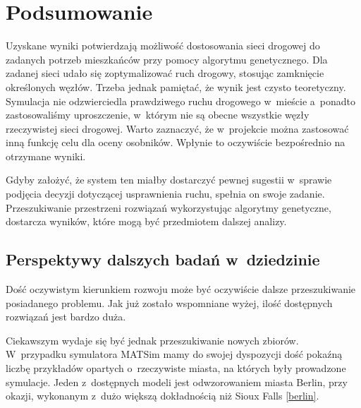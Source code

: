 \documentclass[twoside,12pt]{report}
\let\oldsection\chapter
\def\chapter{\cleardoublepage\oldsection}
\begin{document}
\chapter{Podsumowanie}\label{rozdz.podsumowanie} 
Uzyskane wyniki potwierdzają możliwość dostosowania sieci drogowej do zadanych potrzeb mieszkańców przy pomocy algorytmu genetycznego. Dla zadanej sieci udało się zoptymalizować ruch drogowy, stosując zamknięcie określonych węzłów. Trzeba jednak pamiętać, że wynik jest czysto teoretyczny. Symulacja nie odzwierciedla prawdziwego ruchu drogowego w~mieście a~ponadto zastosowaliśmy uproszczenie, w~którym nie są obecne wszystkie węzły rzeczywistej sieci drogowej. Warto zaznaczyć, że w~projekcie można zastosować inną funkcję celu dla oceny osobników. Wpłynie to oczywiście bezpośrednio na otrzymane wyniki.

Gdyby założyć, że system ten miałby dostarczyć pewnej sugestii w~sprawie podjęcia decyzji dotyczącej usprawnienia ruchu, spełnia on swoje zadanie. Przeszukiwanie przestrzeni rozwiązań wykorzystując algorytmy genetyczne, dostarcza wyników, które mogą być przedmiotem dalszej analizy.



\section{Perspektywy dalszych badań w~dziedzinie}
Dość oczywistym kierunkiem rozwoju może być oczywiście dalsze przeszukiwanie posiadanego problemu. Jak już zostało wspomniane wyżej, ilość dostępnych rozwiązań jest bardzo duża.

Ciekawszym wydaje się być jednak przeszukiwanie nowych zbiorów. W~przypadku symulatora MATSim mamy do swojej dyspozycji dość pokaźną liczbę przykładów opartych o~rzeczywiste miasta, na których były prowadzone symulacje. Jeden z~dostępnych modeli jest odwzorowaniem miasta Berlin, przy okazji, wykonanym z~dużo większą dokładnością niż Sioux Falls \ref{berlin}.
\end{document}
